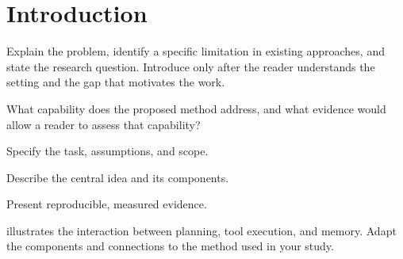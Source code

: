 \section{Introduction}
\label{sec:introduction}
Explain the problem, identify a specific limitation in existing approaches,
and state the research question. Introduce \ourmethod{} only after the reader
understands the setting and the gap that motivates the work.

\begin{rpsquestion}
What capability does the proposed method address, and what evidence would
allow a reader to assess that capability?
\end{rpsquestion}

\begin{contributions}
  \item {} Specify the task, assumptions, and scope.
  \item {} Describe the central idea and its components.
  \item {} Present reproducible, measured evidence.
\end{contributions}

 illustrates the interaction between planning, tool
execution, and memory. Adapt the components and connections to the method
used in your study.

